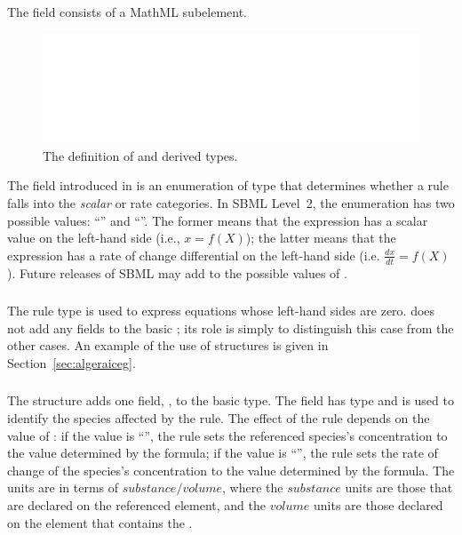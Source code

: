 \documentclass[10pt,twocolumntoc]{cekarticle}
\begin{document}
The  field consists of a MathML 
subelement.

\begin{figure}[htb]
  \centering
  \includegraphics[scale = 0.68]{rule}
  \caption{The definition of  and derived types.}
  \label{fig:rules}
\end{figure}

The  field introduced in  is an
enumeration of type  that determines whether a
rule falls into the \emph{scalar} or {rate} categories. In
SBML Level~2, the enumeration has two possible values:
``'' and ``''.  The former means that
the expression has a scalar value on the left-hand side (i.e., $x
= f(X)$); the latter means that
the expression has a rate of change differential on the left-hand
side (i.e. $\frac{d x}{d t} = f(X)$). Future releases of SBML may
add to the possible values of .

\subsubsection{}

The rule type  is used to express equations
whose left-hand sides are zero.   does not
add any fields to the basic ; its role is simply to
distinguish this case from the other cases.  An example of the use
of  structures is given in
Section~\ref{sec:algeraiceg}.

\subsubsection{}

The  structure adds one field,
, to the basic  type.  The
field  has type  and is used to
identify the species affected by the rule.  The effect of the rule
depends on the value of : if the value is
``'', the rule sets the referenced species's
concentration to the value determined by the formula; if the value
is ``'', the rule sets the rate of change of the
species's concentration to the value determined by the formula.
The units are in terms of $substance/volume$, where the
$substance$ units are those that are declared on the referenced
 element, and the $volume$ units are those declared
on the  element that contains the
.
\end{document}
